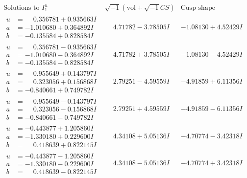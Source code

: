 \documentclass[1p]{elsarticle_modified}
\theoremstyle{definition}
\newcommand{\I}{\sqrt{-1}}
\begin{document}
$$\begin{array}{c|c|c}  
\text{Solutions to }I^u_{1}& \I (\text{vol} + \sqrt{-1}CS) & \text{Cusp shape}\\
 \hline 
\begin{aligned}
u &= \phantom{-}0.356781 + 0.935663 I \\
a &= -1.010680 + 0.364892 I \\
b &= -0.135584 + 0.828584 I\end{aligned}
 & \phantom{-}4.71782 - 3.78505 I & -1.08130 + 4.52429 I \\ \hline\begin{aligned}
u &= \phantom{-}0.356781 - 0.935663 I \\
a &= -1.010680 - 0.364892 I \\
b &= -0.135584 - 0.828584 I\end{aligned}
 & \phantom{-}4.71782 + 3.78505 I & -1.08130 - 4.52429 I \\ \hline\begin{aligned}
u &= \phantom{-}0.955649 + 0.143797 I \\
a &= \phantom{-}0.323056 + 0.156868 I \\
b &= -0.840661 + 0.749782 I\end{aligned}
 & \phantom{-}2.79251 - 4.59559 I & -4.91859 + 6.11356 I \\ \hline\begin{aligned}
u &= \phantom{-}0.955649 - 0.143797 I \\
a &= \phantom{-}0.323056 - 0.156868 I \\
b &= -0.840661 - 0.749782 I\end{aligned}
 & \phantom{-}2.79251 + 4.59559 I & -4.91859 - 6.11356 I \\ \hline\begin{aligned}
u &= -0.443877 + 1.205860 I \\
a &= -1.330180 + 0.229600 I \\
b &= \phantom{-}0.418639 + 0.822145 I\end{aligned}
 & \phantom{-}4.34108 + 5.05136 I & -4.70774 - 3.42318 I \\ \hline\begin{aligned}
u &= -0.443877 - 1.205860 I \\
a &= -1.330180 - 0.229600 I \\
b &= \phantom{-}0.418639 - 0.822145 I\end{aligned}
 & \phantom{-}4.34108 - 5.05136 I & -4.70774 + 3.42318 I \\ \hline\begin{aligned}

\end{aligned}
\end{array}$$
\end{document}
